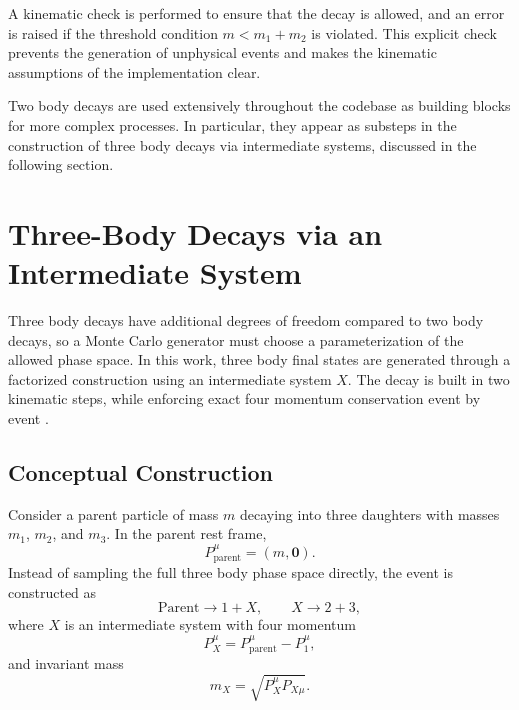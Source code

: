 \documentclass[11pt,a4paper]{article}
\begin{document}
A kinematic check is performed to ensure that the decay is allowed, and an error
is raised if the threshold condition $m < m_1 + m_2$ is violated. This explicit
check prevents the generation of unphysical events and makes the kinematic
assumptions of the implementation clear.

Two body decays are used extensively throughout the codebase as building blocks
for more complex processes. In particular, they appear as substeps in the
construction of three body decays via intermediate systems, discussed in the
following section.


\section{Three-Body Decays via an Intermediate System}
\label{sec:three_body}

Three body decays have additional degrees of freedom compared to two body decays, so a
Monte Carlo generator must choose a parameterization of the allowed phase space. In this
work, three body final states are generated through a factorized construction using an
intermediate system $X$. The decay is built in two kinematic steps, while enforcing exact
four momentum conservation event by event \cite{thomson_modern}.

\subsection{Conceptual Construction}

Consider a parent particle of mass $m$ decaying into three daughters with masses
$m_1$, $m_2$, and $m_3$. In the parent rest frame,
\begin{equation}
P_{\text{parent}}^\mu = (m, \mathbf{0}) .
\end{equation}
Instead of sampling the full three body phase space directly, the event is constructed as
\begin{equation}
\text{Parent} \rightarrow 1 + X, \qquad
X \rightarrow 2 + 3 ,
\end{equation}
where $X$ is an intermediate system with four momentum
\begin{equation}
P_X^\mu = P_{\text{parent}}^\mu - P_1^\mu ,
\end{equation}
and invariant mass
\begin{equation}
m_X = \sqrt{P_X^\mu P_{X\mu}} .
\end{equation}
\end{document}
